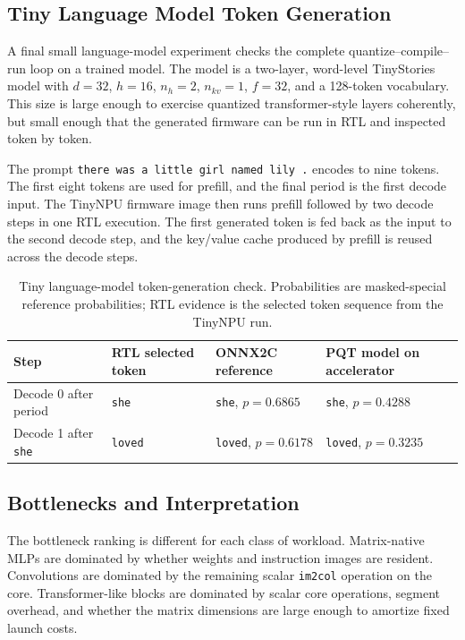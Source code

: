 \documentclass[a4paper, 12pt, titlepage]{article}
\begin{document}
\subsection{Tiny Language Model Token Generation}

A final small language-model experiment checks the complete quantize--compile--run loop on a trained model. The model is a two-layer, word-level TinyStories model with \(d=32\), \(h=16\), \(n_h=2\), \(n_{kv}=1\), \(f=32\), and a 128-token vocabulary. This size is large enough to exercise quantized transformer-style layers coherently, but small enough that the generated firmware can be run in RTL and inspected token by token.

The prompt \texttt{there was a little girl named lily .} encodes to nine tokens. The first eight tokens are used for prefill, and the final period is the first decode input. The TinyNPU firmware image then runs prefill followed by two decode steps in one RTL execution. The first generated token is fed back as the input to the second decode step, and the key/value cache produced by prefill is reused across the decode steps.

\begin{table}[H]
    \centering
    \footnotesize
    \caption{Tiny language-model token-generation check. Probabilities are masked-special reference probabilities; RTL evidence is the selected token sequence from the TinyNPU run.}
    \label{tab:tinylm-token-generation}
    \begin{tabularx}{\textwidth}{|>{\raggedright\arraybackslash}p{}|>{\raggedright\arraybackslash}p{}|>{\raggedright\arraybackslash}X|>{\raggedright\arraybackslash}X|}
        \hline
        \textbf{Step} & \textbf{RTL selected token} & \textbf{ONNX2C reference} & \textbf{PQT model on accelerator} \\
        \hline
        Decode 0 after period & \texttt{she} & \texttt{she}, \(p=0.6865\) & \texttt{she}, \(p=0.4288\) \\
        \hline
        Decode 1 after \texttt{she} & \texttt{loved} & \texttt{loved}, \(p=0.6178\) & \texttt{loved}, \(p=0.3235\) \\
        \hline
    \end{tabularx}
\end{table}

\subsection{Bottlenecks and Interpretation}
The bottleneck ranking is different for each class of workload. Matrix-native MLPs are dominated by whether weights and instruction images are resident. Convolutions are dominated by the remaining scalar \texttt{im2col} operation on the core. Transformer-like blocks are dominated by scalar core operations, segment overhead, and whether the matrix dimensions are large enough to amortize fixed launch costs.
\end{document}
